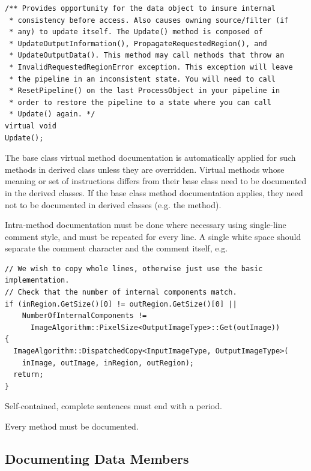 \small
\begin{verbatim}
/** Provides opportunity for the data object to insure internal
 * consistency before access. Also causes owning source/filter (if
 * any) to update itself. The Update() method is composed of
 * UpdateOutputInformation(), PropagateRequestedRegion(), and
 * UpdateOutputData(). This method may call methods that throw an
 * InvalidRequestedRegionError exception. This exception will leave
 * the pipeline in an inconsistent state. You will need to call
 * ResetPipeline() on the last ProcessObject in your pipeline in
 * order to restore the pipeline to a state where you can call
 * Update() again. */
virtual void
Update();
\end{verbatim}
\normalsize

The base class virtual method documentation is automatically applied for such
methods in derived class unless they are overridden. Virtual methods whose
meaning or set of instructions differs from their base class need to be
documented in the derived classes. If the base class method documentation
applies, they need not to be documented in derived classes (e.g. the
 method).

Intra-method documentation must be done where necessary using single-line comment
style, and must be repeated for every line. A single white space should separate
the comment character \code{//} and the comment itself, e.g.

\small
\begin{verbatim}
// We wish to copy whole lines, otherwise just use the basic implementation.
// Check that the number of internal components match.
if (inRegion.GetSize()[0] != outRegion.GetSize()[0] ||
    NumberOfInternalComponents !=
      ImageAlgorithm::PixelSize<OutputImageType>::Get(outImage))
{
  ImageAlgorithm::DispatchedCopy<InputImageType, OutputImageType>(
    inImage, outImage, inRegion, outRegion);
  return;
}
\end{verbatim}
\normalsize

Self-contained, complete sentences must end with a period.

Every method must be documented.


\subsection{Documenting Data Members}%
\label{subsec:DocumentingDataMembers}

